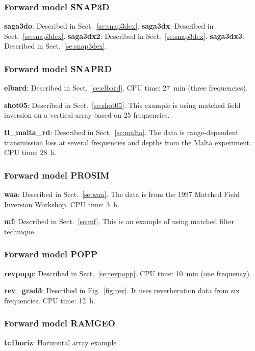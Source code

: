 \documentclass{saclantc}
\begin{document}
\subsubsection{Forward model SNAP3D}

\vspace*{-1.0mm}\noindent
{\bf saga3do}: Described in Sect.~\ref{se:snap3dex}. 
{\bf saga3dx}: Described in Sect.~\ref{se:snap3dex}. 
{\bf saga3dx2}: Described in Sect.~\ref{se:snap3dex}. 
{\bf saga3dx3}: Described in Sect.~\ref{se:snap3dex}. 

\subsubsection{Forward model SNAPRD}
\noindent
{\bf elbard}: Described in Sect.~\ref{se:elbard}. 
 CPU time: 27~min (three frequencies).

{\bf shot05}: Described in Sect.~\ref{se:shot05}. 
 This example is using matched field inversion on
a vertical array based on 25 frequencies.

\noindent
{\bf tl\_malta\_rd}: Described in Sect.\ \ref{se:malta}. 
The data is range-dependent transmission loss at several frequencies and depths from the
Malta experiment. CPU time: 28~h.


\subsubsection{Forward model PROSIM}
\noindent
{\bf waa}: Described in Sect.~\ref{se:waa}. The data is from the 1997 
Matched Field Inversion Workshop. CPU time: 3~h.

\noindent
{\bf mf}: Described in Sect.~\ref{se:mf}. This is an example of using
matched filter technique. 

\subsubsection{Forward model POPP}
\noindent
{\bf revpopp}: Described in Sect.~\ref{se:revpopp}. CPU time: 10~min (one frequency).

\noindent
{\bf rev\_grad3}: Described in Fig.\ \ref{fig:rev}. It uses
reverberation data from six frequencies. CPU time: 12~h.

\subsubsection{Forward model RAMGEO}
\noindent
{\bf tc1horiz}: Horizontal array example \cite{gerstoft03ph}.
\end{document}
